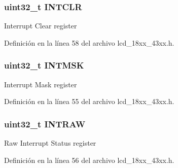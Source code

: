 \subsubsection[{\texorpdfstring{I\+N\+T\+C\+LR}{INTCLR}}]{ uint32\+\_\+t I\+N\+T\+C\+LR}\hypertarget{struct_l_p_c___l_c_d___t_a56433c4c135f086513ce8a38d2ccf9a7}{}\label{struct_l_p_c___l_c_d___t_a56433c4c135f086513ce8a38d2ccf9a7}
Interrupt Clear register 

Definición en la línea 58 del archivo lcd\+\_\+18xx\+\_\+43xx.\+h.

\subsubsection[{\texorpdfstring{I\+N\+T\+M\+SK}{INTMSK}}]{ uint32\+\_\+t I\+N\+T\+M\+SK}\hypertarget{struct_l_p_c___l_c_d___t_af1cda4ad5dfe8311da11f696c33a10c8}{}\label{struct_l_p_c___l_c_d___t_af1cda4ad5dfe8311da11f696c33a10c8}
Interrupt Mask register 

Definición en la línea 55 del archivo lcd\+\_\+18xx\+\_\+43xx.\+h.

\subsubsection[{\texorpdfstring{I\+N\+T\+R\+AW}{INTRAW}}]{ uint32\+\_\+t I\+N\+T\+R\+AW}\hypertarget{struct_l_p_c___l_c_d___t_a804f5e13d75df9427c10ac711349a2e9}{}\label{struct_l_p_c___l_c_d___t_a804f5e13d75df9427c10ac711349a2e9}
Raw Interrupt Status register 

Definición en la línea 56 del archivo lcd\+\_\+18xx\+\_\+43xx.\+h.

